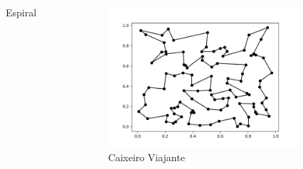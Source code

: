 \documentclass[aspectratio=169,usenames,dvipsnames]{beamer}
\begin{document}
\begin{frame}
\begin{columns}
\begin{center}
\begin{figure}
        \caption{Espiral}
        \end{figure}
    \end{center}
    \begin{center}
        \begin{figure}
          \includegraphics[width=0.95\textwidth]{figures/polygon_100_1.png}
          \caption{Caixeiro Viajante}
        \end{figure}
    \end{center}
  \end{columns}
\end{frame}
\end{document}
